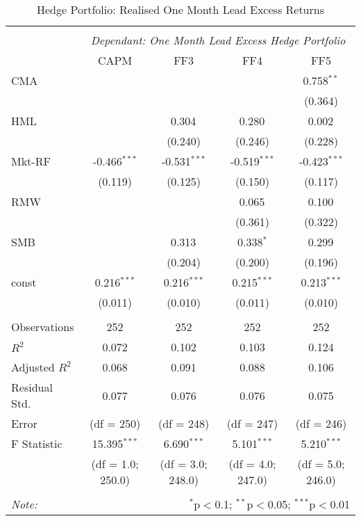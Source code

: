 \begin{table}[H] \centering
    \begin{tabular}{@{\extracolsep{5pt}}lcccc}
      \\[-1.8ex]\hline
      \hline                                                                                                                                                        \\[-1.8ex]
                     & \multicolumn{4}{c}{\textit{Dependant: One Month Lead Excess Hedge Portfolio}} \
      \cr \cline{2-5}
      \\[-1.8ex] & CAPM & FF3 & FF4 & FF5 \\
      \hline
      CMA & & & & 0.758$^{**}$ \\
  & & & & (0.364) \\
 HML & & 0.304$^{}$ & 0.280$^{}$ & 0.002$^{}$ \\
  & & (0.240) & (0.246) & (0.228) \\
 Mkt-RF & -0.466$^{***}$ & -0.531$^{***}$ & -0.519$^{***}$ & -0.423$^{***}$ \\
  & (0.119) & (0.125) & (0.150) & (0.117) \\
 RMW & & & 0.065$^{}$ & 0.100$^{}$ \\
  & & & (0.361) & (0.322) \\
 SMB & & 0.313$^{}$ & 0.338$^{*}$ & 0.299$^{}$ \\
  & & (0.204) & (0.200) & (0.196) \\
 const & 0.216$^{***}$ & 0.216$^{***}$ & 0.215$^{***}$ & 0.213$^{***}$ \\
  & (0.011) & (0.010) & (0.011) & (0.010) \\
\hline \\[-1.8ex]
 Observations & 252 & 252 & 252 & 252 \\
 $R^2$ & 0.072 & 0.102 & 0.103 & 0.124 \\
 Adjusted $R^2$ & 0.068 & 0.091 & 0.088 & 0.106 \\
 Residual Std. & 0.077 & 0.076 & 0.076 &0.075 \\
 Error & (df = 250) & (df = 248) & (df = 247) & (df = 246)  \\
 F Statistic & 15.395$^{***}$ & 6.690$^{***}$ & 5.101$^{***}$ & 5.210$^{***}$  \\
 & (df = 1.0; 250.0) & (df = 3.0; 248.0) & (df = 4.0; 247.0) & (df = 5.0; 246.0) \\
      \hline
      \hline                                                                                                                                                        \\[-1.8ex]
      \textit{Note:} & \multicolumn{4}{r}{$^{*}$p$<$0.1; $^{**}$p$<$0.05; $^{***}$p$<$0.01}                                                                                                                     \\
    \end{tabular}
    \caption{Hedge Portfolio: Realised One Month Lead Excess Returns}
    \label{hp-apm}
  \end{table}